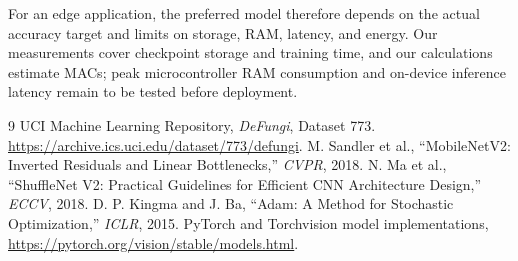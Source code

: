\documentclass[11pt,a4paper]{article}
\begin{document}
For an edge application, the preferred model therefore depends on the actual accuracy target and limits on storage, RAM, latency, and energy. Our measurements cover checkpoint storage and training time, and our calculations estimate MACs; peak microcontroller RAM consumption and on-device inference latency remain to be tested before deployment.

\begin{thebibliography}{9}
 UCI Machine Learning Repository, \textit{DeFungi}, Dataset 773. \url{https://archive.ics.uci.edu/dataset/773/defungi}.
 M. Sandler et al., ``MobileNetV2: Inverted Residuals and Linear Bottlenecks,'' \textit{CVPR}, 2018.
 N. Ma et al., ``ShuffleNet V2: Practical Guidelines for Efficient CNN Architecture Design,'' \textit{ECCV}, 2018.
 D. P. Kingma and J. Ba, ``Adam: A Method for Stochastic Optimization,'' \textit{ICLR}, 2015.
 PyTorch and Torchvision model implementations, \url{https://pytorch.org/vision/stable/models.html}.
\end{thebibliography}
\end{document}
